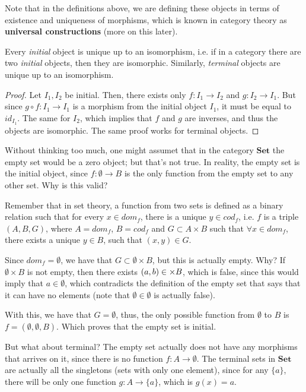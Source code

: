 Note that in the definitions above, we are defining these objects in terms of existence and
uniqueness of morphisms, which is known in category theory as \textbf{universal constructions}
(more on this later).

\begin{theorem}
  Every \textit{initial} object is unique up to an isomorphism, i.e. if in a category there 
  are two \textit{initial} objects, then they are isomorphic.
  Similarly, \textit{terminal} objects are unique up to an isomorphism.
\end{theorem}
\begin{proof}
  Let $I_1, I_2$ be initial. Then, there exists only $f:I_1 \to I_2$ and $g:I_2 \to I_1$.
  But since $g \circ f:I_1 \to I_1$ is a morphism from the initial object $I_1$, it must
  be equal to $id_{I_1}$. The same for $I_2$, which implies that $f$ and $g$ are inverses,
  and thus the objects are isomorphic.
  The same proof works for terminal objects.
\end{proof}


\begin{example}
Without thinking too much, one might assumet that in the category $\mathbf{Set}$
the empty set would be a zero object; but that's not true.
In reality, the empty set is the initial object, since $f:\emptyset \to B$
is the only function from the empty set to any other set. Why is this valid?

Remember that in set theory, a function from two sets is defined as a binary
relation such that for every $x \in dom_f$, there is a unique $y \in cod_f$, i.e.
$f$ is a triple $(A,B,G)$, where $A = dom_f$, $B = cod_f$ and $G \subset A \times B$
such that $\forall x \in dom_f$, there exists a unique $y \in B$, such that $(x,y) \in G$.

Since $dom_f = \emptyset$, we have that $G \subset \emptyset \times B$, but this
is actually empty. Why? If $\emptyset \times B$ is not empty, then there exists
$(a,b) \in \empty \times B$, which is false, since this would imply that
$a \in \emptyset$, which contradicts the definition of the empty set that says
that it can have no elements (note that $\emptyset \in \emptyset$ is actually false).

With this, we have that $G = \emptyset$, thus, the only possible function from
$\emptyset$ to $B$ is $f = (\emptyset, \emptyset, B)$. Which proves that the
empty set is initial.

But what about terminal? The empty set actually does not have any morphisms
that arrives on it, since there is no function $f:A \to \emptyset$.
The terminal sets in $\mathbf{Set}$ are actually all the singletons (sets with only
one element), since for any $\{a\}$, there will be only one function
$g: A \to \{a\}$, which is $g(x) = a$.
\end{example}

